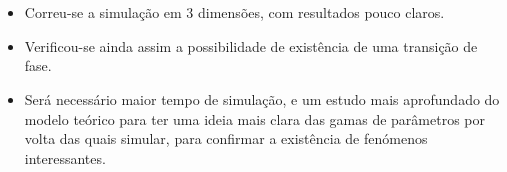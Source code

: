 \documentclass[11pt]{beamer}
\begin{document}
\begin{frame}
\frametitle{\insertsection \\ {\small \insertsubsection}}
\begin{itemize}
\item Correu-se a simulação em 3 dimensões, com resultados pouco claros.

\item Verificou-se ainda assim a possibilidade de existência de uma transição de fase.

\item Será necessário maior tempo de simulação, e um estudo mais aprofundado do modelo teórico para ter uma ideia mais clara das gamas de parâmetros por volta das quais simular, para confirmar a existência de fenómenos interessantes.
\end{itemize}
\end{frame}
\end{document}
